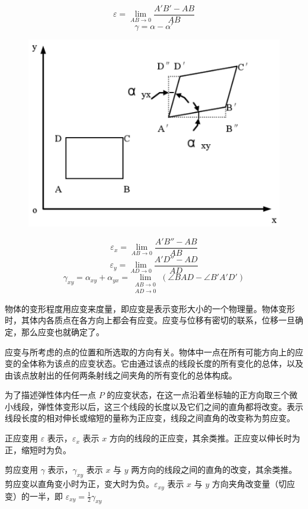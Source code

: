 \documentclass[12pt,a4paper]{article}
\begin{document}
$$
\varepsilon =\lim\limits_{AB \to 0}\frac{A'B'-AB}{AB}
$$
$$
\gamma = \alpha-\alpha'
$$

\begin{figure}[H]
\centering
\includegraphics[scale=0.4]{./figures/24.png}
\caption{}
\end{figure}

$$
\varepsilon_x =\lim_{AB \to 0}\frac{A'B''-AB}{AB}
$$
$$
\varepsilon_y =\lim_{AD \to 0}\frac{A'D''-AD}{AD}
$$
$$
\gamma_{xy} =\alpha_{xy}+\alpha_{yx}=\lim\limits_{\substack{AB \to 0 \\ AD \to 0}}(\angle BAD-\angle B'A'D')
$$

物体的变形程度用应变来度量，即应变是表示变形大小的一个物理量。物体变形时，其体内各质点在各方向上都会有应变。应变与位移有密切的联系，位移一旦确定，那么应变也就确定了。

应变与所考虑的点的位置和所选取的方向有关。物体中一点在所有可能方向上的应变的全体称为该点的应变状态。它由通过该点的线段长度的所有变化的总体，以及由该点放射出的任何两条射线之间夹角的所有变化的总体构成。

为了描述弹性体内任一点 $P$ 的应变状态，在这一点沿着坐标轴的正方向取三个微小线段，弹性体变形以后，这三个线段的长度以及它们之间的直角都将改变。表示线段长度的相对伸长或缩短的量称为正应变，线段之间直角的改变称为剪应变。

正应变用 $\varepsilon$ 表示，$\varepsilon_x$ 表示 $x$ 方向的线段的正应变，其余类推。正应变以伸长时为正，缩短时为负。

剪应变用 $\gamma$ 表示，$\gamma_{xy}$ 表示 $x$ 与 $y$ 两方向的线段之间的直角的改变，其余类推。剪应变以直角变小时为正，变大时为负。$\varepsilon_{xy}$ 表示 $x$ 与 $y$ 方向夹角改变量（切应变）的一半，即 $\varepsilon_{xy}=\frac{1}{2}\gamma_{xy}$
\end{document}
